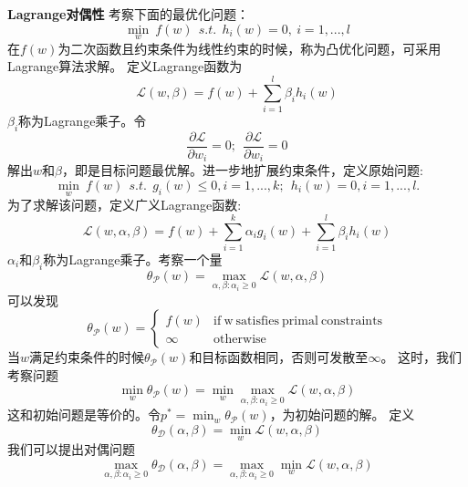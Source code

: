 \textbf{Lagrange对偶性}
考察下面的最优化问题：
\begin{equation}
    \min_w~f(w)~~s.t.~~h_i(w)=0,~i=1,...,l
\end{equation}
在$f(w)$为二次函数且约束条件为线性约束的时候，称为凸优化问题，可采用Lagrange算法求解。
定义Lagrange函数为
\begin{equation}
    \mathcal{L}(w,\beta)=f(w)+\sum^l_{i=1}\beta_ih_i(w)
\end{equation}
$\beta_i$称为Lagrange乘子。令
\begin{equation}
    \frac{\partial\mathcal{L}}{\partial{}w_i}=0;~~\frac{\partial\mathcal{L}}{\partial{}w_i}=0
\end{equation}
解出$w$和$\beta$，即是目标问题最优解。进一步地扩展约束条件，定义原始问题:
\begin{equation}
    \min_w~f(w)~~s.t.~~g_i(w)\leq0,i=1,...,k;~~h_i(w)=0,i=1,...,l.
\end{equation}
为了求解该问题，定义广义Lagrange函数:
\begin{equation}
    \mathcal{L}(w,\alpha,\beta)=f(w)+\sum^k_{i=1}\alpha_ig_i(w)+
    \sum^l_{i=1}\beta_ih_i(w)
\end{equation}
$\alpha_i$和$\beta_i$称为Lagrange乘子。考察一个量
\begin{equation}
    \theta_{\mathcal{P}}(w)=\max_{\alpha,\beta:\alpha_i\geq0}
    \mathcal{L}(w,\alpha,\beta)
\end{equation}
可以发现
\begin{equation}
    \theta_{\mathcal{P}}(w)=\left\{\begin{array}{ll}
            f(w)&\mathrm{if~w~satisfies~primal~constraints}\\
            \infty&\mathrm{otherwise}
    \end{array}\right.
\end{equation}
当$w$满足约束条件的时候$\theta_{\mathcal{P}}(w)$和目标函数相同，否则可发散至$\infty$。
这时，我们考察问题
\begin{equation}
    \min_w\theta_{\mathcal{P}}(w)=\min_w\max_{\alpha,\beta:\alpha_i\geq0}\mathcal{L}(w,\alpha,\beta)
\end{equation}
这和初始问题是等价的。令$p^*=\min_w\theta_{\mathcal{P}}(w)$，为初始问题的解。
定义
\begin{equation}
    \theta_{\mathcal{D}}(\alpha,\beta)=\min_w\mathcal{L}(w,\alpha,\beta)
\end{equation}
我们可以提出对偶问题
\begin{equation}
    \max_{\alpha,\beta:\alpha_i\geq0}\theta_{\mathcal{D}}(\alpha,\beta)=
    \max_{\alpha,\beta:\alpha_i\geq0}\min_w\mathcal{L}(w,\alpha,\beta)
\end{equation}
